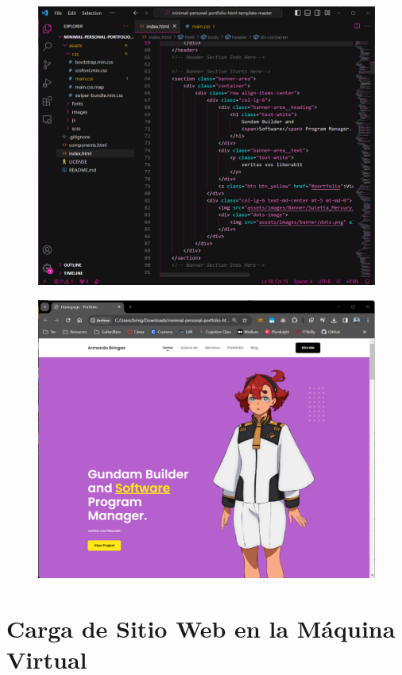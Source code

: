 \documentclass[12pt,a4paper]{article}
\begin{document}
\begin{figure}[H]
    \centering
    \includegraphics[width=.75\linewidth]{M3_Virtualización_y_Contenedores/Tarea_2_Máquina_Virtual_Local/reporte/figuras/5-1_Personalización_Sitio_Web.png}
    \label{fig:Personalización_sitio_web_1}
\end{figure}

\begin{figure}[H]
    \centering
    \includegraphics[width=.75\linewidth]{M3_Virtualización_y_Contenedores/Tarea_2_Máquina_Virtual_Local/reporte/figuras/5-2_Personalización_Sitio_Web.png}
    \label{fig:Personalización_sitio_web_2}
\end{figure}


\section{Carga de Sitio Web en la Máquina Virtual}
\end{document}
